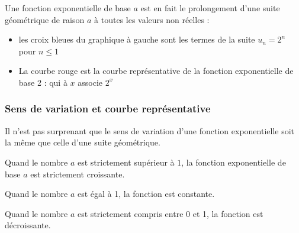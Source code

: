 \documentclass[10pt,a4paper]{book}
\begin{document}
\begin{minipage}{0.4\textwidth}
\end{minipage}
\begin{minipage}{0.58\textwidth}
    Une fonction exponentielle de base $a$ est en fait le prolongement d'une suite géométrique de raison $a$ à toutes les valeurs non réelles : 
    \begin{itemize}
        \item les croix bleues du graphique à gauche sont les termes de la suite $u_n = 2^n$ pour $n \leq 1$
        \item La courbe rouge est la courbe représentative de la fonction exponentielle de base 2 : qui à $x$ associe $2^x$
    \end{itemize}
\end{minipage}

\subsubsection{Sens de variation et courbe représentative}

Il n'est pas surprenant que le sens de variation d'une fonction exponentielle soit la même que celle 
d'une suite géométrique. 

\begin{prop}
Quand le nombre $a$ est strictement supérieur à $1$, la fonction exponentielle de base $a$  
est strictement croissante. 

Quand le nombre $a$ est égal à 1, la fonction est constante.

Quand le nombre $a$ est strictement compris entre 0 et 1, la fonction est décroissante.
\end{prop}
\end{document}
